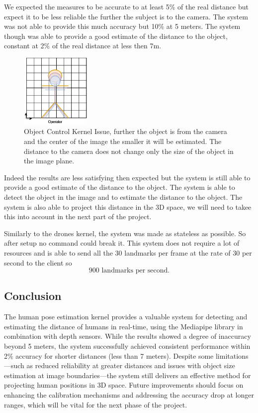 We expected the measures to be accurate to at least 5\% of the real distance but expect it to be less reliable the further the subject is to the camera. The system was not able to provide this much accuracy but 10\% at 5 meters. The system though was able to provide a good estimate of the distance to the object, constant at 2\% of the real distance at less then 7m.
\begin{figure}[htbp]
    \centerline{\includegraphics[width=0.3\textwidth]{images/humanreconitionflaw.png}}
    \caption{Object Control Kernel Issue, further the object is from the camera and the center of the image the smaller it will be estimated. The distance to the camera does not change only the size of the object in the image plane.}
    \label{fig}
    \end{figure} 
Indeed the results are less satisfying then expected but the system is still able to provide a good estimate of the distance to the object. The system is able to detect the object in the image and to estimate the distance to the object. The system is also able to project this distance in the \gls{3D} space, we will need to takee this into account in the next part of the project.

Similarly to the drones kernel, the system was made as stateless as possible. So after setup no command could break it. This system does not require a lot of resources and is able to send all the 30 landmarks per frame at the rate of 30 per second to the client so \[900 \text{ landmarks per second.}\]

\subsection{Conclusion} 
The human pose estimation kernel provides a valuable system for detecting and estimating the distance of humans in real-time, using the Mediapipe library in combination with depth sensors. While the results showed a degree of inaccuracy beyond 5 meters, the system successfully achieved consistent performance within 2\% accuracy for shorter distances (less than 7 meters). Despite some limitations—such as reduced reliability at greater distances and issues with object size estimation at image boundaries—the system still delivers an effective method for projecting human positions in \gls{3D} space. Future improvements should focus on enhancing the calibration mechanisms and addressing the accuracy drop at longer ranges, which will be vital for the next phase of the project.